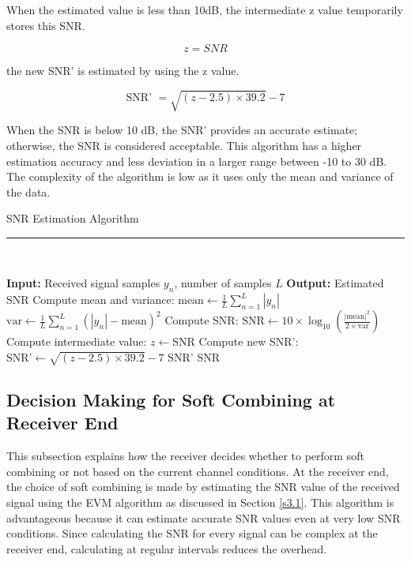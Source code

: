 \documentclass[sn-mathphys-num]{sn-jnl}
\theoremstyle{thmstyleone}
\theoremstyle{thmstyletwo}%
\theoremstyle{thmstylethree}%
\begin{document}
When the estimated value is less than 10dB, the intermediate z value temporarily stores this SNR. 

\begin{equation} 
    z = SNR
\end{equation}

the new SNR' is estimated by using the z value.

\begin{equation}
\text{SNR' } = \sqrt{ (z - 2.5) \times 39.2 } - 7
\end{equation}

When the SNR is below 10 dB, the SNR' provides an accurate estimate; otherwise, the SNR is considered acceptable. This algorithm has a higher estimation accuracy and less deviation in a larger range between -10 to 30 dB. The complexity of the algorithm is low as it uses only the mean and variance of the data.

\begin{algorithm}
    \caption{SNR Estimation Algorithm \cite{r20}}
    \rule{\linewidth}{0.5pt}\\
    \label{alg:snr_estimation}
    \begin{algorithmic}[1]
        \State \textbf{Input:} Received signal samples $y_n$, number of samples $L$
        \State \textbf{Output:} Estimated SNR
        \State Compute mean and variance:
        \State \quad $\text{mean} \gets \frac{1}{L} \sum_{n=1}^{L} |y_n|$
        \State \quad $\text{var} \gets \frac{1}{L} \sum_{n=1}^{L} (|y_n| - \text{mean})^2$
        \State Compute SNR:
        \State \quad $\text{SNR} \gets 10 \times \log_{10}\left(\frac{|\text{mean}|^2}{2 \times \text{var}}\right)$
            \State Compute intermediate value:
            \State \quad $z \gets \text{SNR}$
            \State Compute new SNR':
            \State \quad $\text{SNR'} \gets \sqrt{(z - 2.5) \times 39.2} - 7$
            \State \Return $\text{SNR'}$
        \Else
            \State \Return $\text{SNR}$
        \EndIf
    \end{algorithmic}
\end{algorithm}

\subsection{Decision Making for Soft Combining at Receiver End} \label{s3.5}

This subsection explains how the receiver decides whether to perform soft combining or not based on the current channel conditions. At the receiver end, the choice of soft combining is made by estimating the SNR value of the received signal using the EVM algorithm as discussed in Section \ref{s3.1}. This algorithm is advantageous because it can estimate accurate SNR values even at very low SNR conditions. Since calculating the SNR for every signal can be complex at the receiver end, calculating at regular intervals reduces the overhead.
\end{document}
